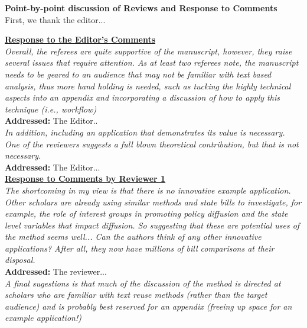 \documentclass[12pt]{article}
\newcommand{\grey}[1]{{\color{mygrey}#1}}
\begin{document}
\thispagestyle{empty}


\noindent \textbf{Point-by-point discussion of Reviews and Response to Comments}\\

First, we thank the editor...

\bigskip
\bigskip


\noindent \underline{\textbf{Response to the Editor's Comments}}\\

 \grey{\emph{Overall, the referees are quite supportive of the manuscript, however, they raise several issues that require attention. As at least two referees note, the manuscript needs to be geared to an audience that may not be familiar with text based analysis, thus more hand holding is needed, such as tucking the highly technical aspects into an appendix and incorporating a discussion of how to apply this technique (i.e., workflow) }}\\

\noindent \textcolor{MyGreen}{\textbf{Addressed:}} The Editor.. \\

 \grey{\emph{In addition, including an application that demonstrates its value is necessary. One of the reviewers suggests a full blown theoretical contribution, but that is not necessary.  }}\\

\noindent \textcolor{MyGreen}{\textbf{Addressed:}} The Editor... \\


\noindent \underline{\textbf{Response to Comments by Reviewer 1}}\\

 \grey{\emph{ The shortcoming in my view is that there is no innovative example application. Other scholars are already using similar methods and state bills to investigate, for example, the role of interest groups in promoting policy diffusion and the state level variables that impact diffusion. So suggesting that these are potential uses of the method seems well... Can the authors think of any other innovative applications? After all, they now have millions of bill comparisons at their disposal.}}\\

\noindent \textcolor{MyGreen}{\textbf{Addressed:}} The reviewer... \\

 \grey{\emph{  A final sugestions is that much of the discussion of the method is directed at scholars who are familiar with text reuse methods (rather than the target audience) and is probably best reserved for an appendix (freeing up space for an example application!)}}\\
\end{document}
